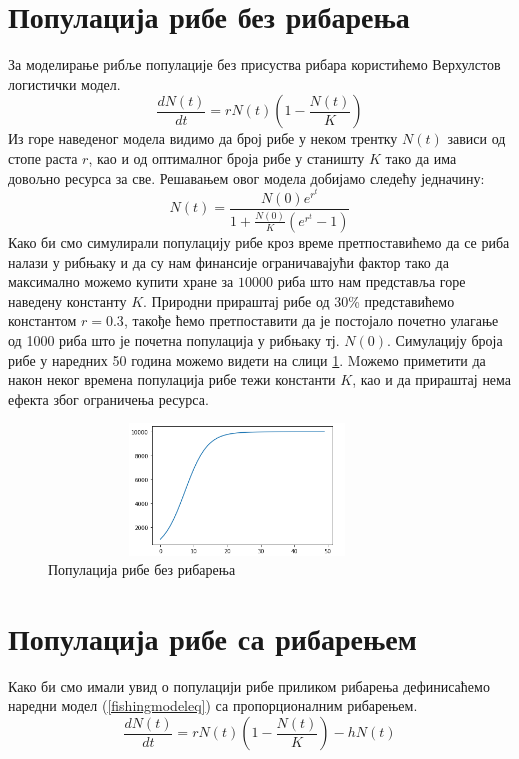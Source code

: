 \documentclass[a4paper]{article}
\begin{document}
{\section{Популација рибе без рибарења}
\label{sec:nofishing}
За моделирање рибље популације без присуства рибара користићемо Верхулстов логистички модел.
\begin{equation}
    \label{nofishingeq}
    \frac{dN(t)}{dt} = rN(t)\left(1-\frac{N(t)}{K}\right)
\end{equation}
Из горе наведеног модела видимо да број рибе у неком трентку $N(t)$ зависи од стопе раста $r$, као и од оптималног броја рибе у станишту $K $ тако да има довољно ресурса за све. Решавањем овог модела добијамо следећу једначину:
\begin{equation}
    \label{nofishingeqsol}
    N(t) = \frac{N(0)e^r^t}{1+\frac{N(0)}{K}(e^r^t - 1)}
\end{equation}
Како би смо симулирали популацију рибе кроз време претпоставићемо да се риба налази у рибњаку и да су нам финансије ограничавајући фактор тако да максимално можемо купити хране за $10000$ риба што нам представља горе наведену константу $K$. Природни прираштај рибе од 30\% представићемо константом $r=0.3$, такође ћемо претпоставити да је постојало почетно улагање од 1000 риба што је почетна популација у рибњаку тј. $N(0)$. Симулацију броја рибе у наредних 50 година можемо видети на слици \ref{fishnofishing_view}. Mожемо приметити да након неког времена популација рибе тежи константи $K$, као и да прираштај нема ефекта због ограничења ресурса.
\begin{figure}[h!]
	\centering
	\includegraphics[width=10cm,height=3.5cm]{images/FishPopulationNoFishing.png}
	\caption{Популација рибе без рибарења}
	\label{fishnofishing_view}
\end{figure}


\section{Популација рибе са рибарењем}
\label{sec:fishingmodel}
Како би смо имали увид о популацији рибе приликом рибарења дефинисаћемо наредни модел (\ref{fishingmodeleq}) са пропорционалним рибарењем.
\begin{equation}
    \label{fishingmodeleq}
    \frac{dN(t)}{dt} = rN(t)\left(1-\frac{N(t)}{K}\right) - hN(t)
\end{equation}

}
\end{document}
